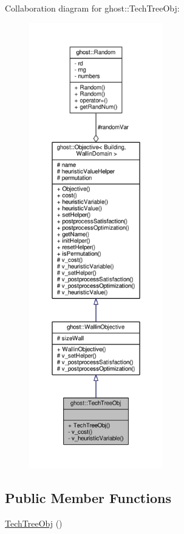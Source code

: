 Collaboration diagram for ghost\-:\-:Tech\-Tree\-Obj\-:\nopagebreak
\begin{figure}[H]
\begin{center}
\leavevmode
\includegraphics[height=550pt]{classghost_1_1TechTreeObj__coll__graph}
\end{center}
\end{figure}
\subsection*{Public Member Functions}
\begin{DoxyCompactItemize}
\item 
\hyperlink{classghost_1_1TechTreeObj_a94ae9f4d4aa715977fab009f54a0dbd5}{Tech\-Tree\-Obj} ()
\end{DoxyCompactItemize}
